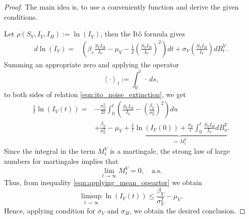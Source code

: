\begin{proof}
    The main idea is, to use a conveniently function and derive the 
    given conditions. 
    
    Let $\rho (S_V, I_V, I_H):= \ln (I_V)$, then the It\^{o} formula 
    gives
    \begin{equation} \label{eqn:ito_noise_extinction}
        \begin{aligned}
            d \ln(I_V) = & 
                \left(
                    \beta_v \frac{S_V I_H}{ I_V} - \mu_V
                    - \frac{1}{2}
                    \left(
                        \frac{S_V I_H}{I_V}
                    \right) ^ 2
                \right) dt
                 + \sigma_V 
                \left(
                    \frac{S_V I_H}{ I_V}
                \right) dB_t ^ V.
        \end{aligned}
    \end{equation}
    Summing an appropriate zero and applying the operator
    $$
        \left < \cdot \right >_t
        := 
        \int_{0} ^ t
            \cdot \ ds,
    $$
    to both sides of relation \eqref{eqn:ito_noise_extinction}, we get
    \begin{equation} \label{eqn:applying_mean_opeartor}
        \begin{aligned}
            \frac{1}{t} \ln(I_V(t))
            =&
            - 
            \frac{\sigma_V ^ 2}{2t}
            \int_{0} ^ {t}
                \left(
                    \frac{S_V I_H}{I_V} 
                    -
                    \left(
                        \frac{\beta_V}{\sigma_V ^ 2}
                    \right) ^ 2
                \right)
            du
            \\
            & + 
            \frac{\beta_V}{\sigma_V ^ 2}
            - 
            \mu_V 
            + 
            \underbrace{
                \frac{1}{t} \ln(I_V(0))
                +
                \frac{\sigma_V}{t}
                \int_{0}^t
                    \frac{S_V I_H}{I_V}
                    dB_u^V
            }_{:=M_t^V} .                  
        \end{aligned}
    \end{equation}
%
    Since the integral in the term $M_t^V$ is a martingale, 
    the strong law of large numbers for martingales \cite{Mao} implies that
    $$
        \lim_{t \to \infty} M_t^V = 0, \quad \text{a.s.}
    $$
    Thus, from inequality \eqref{eqn:applying_mean_opeartor} we obtain
    \begin{equation}\label{eqn:bound_vector_noise}
        \limsup_{t \to \infty} \ln(I_V(t)) 
            \leq
            \frac{\beta_V}{\sigma_V^2} - \mu_V.           
    \end{equation}
    Hence, applying condition for $\sigma_V$ and $\sigma_H$, we obtain the 
    desired conclusion.
\end{proof}
%
%
%

